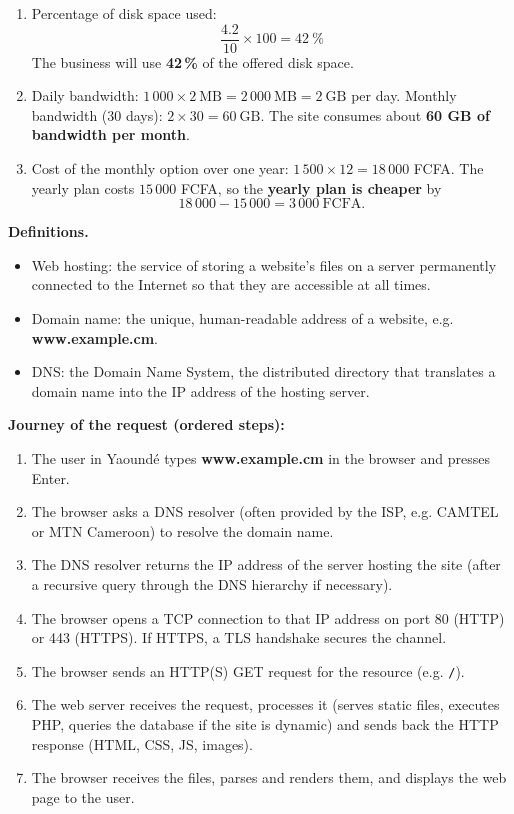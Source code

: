 \documentclass[11pt]{article}
\newcommand{\cle}[1]{{\popxbold\color{popdark}#1}}
\begin{document}
\begin{corrige}
\begin{enumerate}
\item Percentage of disk space used:
\[ \frac{4.2}{10}\times 100 = 42\ \% \]
The business will use \textbf{42\,\%} of the offered disk space.
\item Daily bandwidth: $1\,000 \times 2\ \mathrm{MB} = 2\,000\ \mathrm{MB} = 2\ \mathrm{GB}$ per day.
Monthly bandwidth (30 days): $2 \times 30 = 60\ \mathrm{GB}$.
The site consumes about \textbf{60 GB of bandwidth per month}.
\item Cost of the monthly option over one year: $1\,500 \times 12 = 18\,000$ FCFA.
The yearly plan costs $15\,000$ FCFA, so the \textbf{yearly plan is cheaper} by
\[ 18\,000 - 15\,000 = 3\,000\ \text{FCFA}. \]
\end{enumerate}
\end{corrige}

\begin{corrige}
\textbf{Definitions.}
\begin{itemize}
\item \cle{Web hosting}: the service of storing a website's files on a server permanently connected to the Internet so that they are accessible at all times.
\item \cle{Domain name}: the unique, human-readable address of a website, e.g. \textbf{www.example.cm}.
\item \cle{DNS}: the Domain Name System, the distributed directory that translates a domain name into the IP address of the hosting server.
\end{itemize}
\textbf{Journey of the request (ordered steps):}
\begin{enumerate}
\item The user in Yaoundé types \textbf{www.example.cm} in the browser and presses Enter.
\item The browser asks a DNS resolver (often provided by the ISP, e.g. CAMTEL or MTN Cameroon) to resolve the domain name.
\item The DNS resolver returns the IP address of the server hosting the site (after a recursive query through the DNS hierarchy if necessary).
\item The browser opens a TCP connection to that IP address on port 80 (HTTP) or 443 (HTTPS). If HTTPS, a TLS handshake secures the channel.
\item The browser sends an HTTP(S) GET request for the resource (e.g. \texttt{/}).
\item The web server receives the request, processes it (serves static files, executes PHP, queries the database if the site is dynamic) and sends back the HTTP response (HTML, CSS, JS, images).
\item The browser receives the files, parses and renders them, and displays the web page to the user.
\end{enumerate}
\end{corrige}
\end{document}
